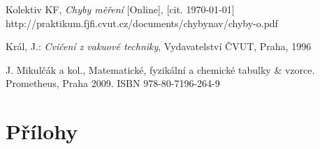 \documentclass[english]{article}
\begin{document}
\begin{thebibliography}{9}

 Kolektiv KF, \emph{Chyby měření} [Online], [cit. \today] \newline http://praktikum.fjfi.cvut.cz/documents/chybynav/chyby-o.pdf

Král, J.: \emph{Cvičení z vakuové techniky},
Vydavatelství ČVUT, Praha, 1996


 J. Mikulčák a kol., Matematické, fyzikální a chemické tabulky \& vzorce. Prometheus,
Praha 2009.\newline
ISBN 978-80-7196-264-9

\end{thebibliography}
\endgroup
\setcounter{equation}{0}

\clearpage
\part*{Přílohy}
\end{document}
